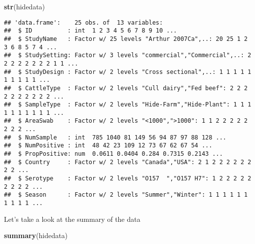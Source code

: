 \documentclass[]{article}
\newenvironment{Shaded}{\begin{snugshade}}{\end{snugshade}}
\newcommand{\KeywordTok}[1]{\textcolor[rgb]{0.13,0.29,0.53}{\textbf{#1}}}
\newcommand{\NormalTok}[1]{#1}
\begin{document}
\begin{Shaded}
\begin{Highlighting}[]
\KeywordTok{str}\NormalTok{(hidedata)}
\end{Highlighting}
\end{Shaded}

\begin{verbatim}
## 'data.frame':    25 obs. of  13 variables:
##  $ ID          : int  1 2 3 4 5 6 7 8 9 10 ...
##  $ StudyName   : Factor w/ 25 levels "Arthur 2007Ca",..: 20 25 1 2 3 6 8 5 7 4 ...
##  $ StudySetting: Factor w/ 3 levels "commercial","Commercial",..: 2 2 2 2 2 2 2 2 1 1 ...
##  $ StudyDesign : Factor w/ 2 levels "Cross sectional",..: 1 1 1 1 1 1 1 1 1 1 ...
##  $ CattleType  : Factor w/ 2 levels "Cull dairy","Fed beef": 2 2 2 2 2 2 2 2 2 2 ...
##  $ SampleType  : Factor w/ 2 levels "Hide-Farm","Hide-Plant": 1 1 1 1 1 1 1 1 1 1 ...
##  $ AreaSwab    : Factor w/ 2 levels "<1000",">1000": 1 1 2 2 2 2 2 2 2 2 ...
##  $ NumSample   : int  785 1040 81 149 56 94 87 97 88 128 ...
##  $ NumPositive : int  48 42 23 109 12 73 67 62 67 54 ...
##  $ PropPositive: num  0.0611 0.0404 0.284 0.7315 0.2143 ...
##  $ Country     : Factor w/ 2 levels "Canada","USA": 2 1 2 2 2 2 2 2 2 2 ...
##  $ Serotype    : Factor w/ 2 levels "O157  ","O157 H7": 1 2 2 2 2 2 2 2 2 2 ...
##  $ Season      : Factor w/ 2 levels "Summer","Winter": 1 1 1 1 1 1 1 1 1 1 ...
\end{verbatim}

Let's take a look at the summary of the data

\begin{Shaded}
\begin{Highlighting}[]
\KeywordTok{summary}\NormalTok{(hidedata)}
\end{Highlighting}
\end{Shaded}
\end{document}
